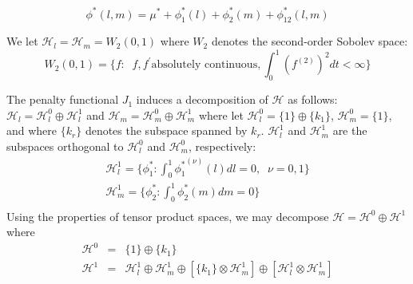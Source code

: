 \documentclass[12pt]{article}
\theoremstyle{definition}
\begin{document}
\begin{equation}
\phi^*\left(l,m\right) = \mu^* + \phi_1^*\left(l\right) + \phi_2^*\left(m\right) + \phi_{12}^*\left(l,m\right)   \label{ANOVA}
\end{equation}
\noindent 

We let $\mathcal{H}_l = \mathcal{H}_m = W_2\left(0,1\right)$ where $W_2$ denotes the second-order Sobolev space:
\[
W_2\left(0,1\right) = \lbrace f: \;\;f, f^\prime \mbox{absolutely continuous}, \int_0^1 \left(f^{\left( 2 \right)}\right)^2 dt < \infty \rbrace
\]  

%
 \noindent
The penalty functional $J_1$ induces a decomposition of $\mathcal{H}$ as follows: $\mathcal{H}_l = \mathcal{H}_l^0 \oplus \mathcal{H}_l^1$ and $\mathcal{H}_m = \mathcal{H}_m^0 \oplus \mathcal{H}_m^1$ where let $\mathcal{H}_l^0 =  \lbrace 1 \rbrace \oplus \lbrace k_1 \rbrace$, $\mathcal{H}_m^0 =  \lbrace  1 \rbrace$, and where $\lbrace k_r \rbrace$ denotes the subspace spanned by $k_r$. $\mathcal{H}_l^1$ and $\mathcal{H}_m^1$ are the subspaces orthogonal to $\mathcal{H}_l^0$ and $\mathcal{H}_m^0$, respectively:
\begin{eqnarray*}
\mathcal{H}_l^1 = \lbrace \phi^*_1: \int_0^1 {\phi_1^*}^{\left( \nu \right)}\left(l\right) dl = 0,\;\; \nu = 0,1\rbrace\\
\mathcal{H}_m^1 = \lbrace \phi^*_2: \int_0^1 \phi_2^* \left(m\right) dm = 0 \rbrace\\
\end{eqnarray*}
\noindent
Using the properties of tensor product spaces, we may decompose $\mathcal{H} = \mathcal{H}^0\oplus \mathcal{H}^1$ where
\begin{eqnarray*}
\mathcal{H}^0 &=& \lbrace 1 \rbrace \oplus \lbrace k_1 \rbrace\\
\mathcal{H}^1 &=& \mathcal{H}_l^1 \oplus \mathcal{H}_m^1 \oplus  \left[ \lbrace k_1 \rbrace  \otimes  \mathcal{H}_m^1 \right]  \oplus  \left[\mathcal{H}_l^1 \otimes  \mathcal{H}_m^1\right]   
\end{eqnarray*}
\end{document}
